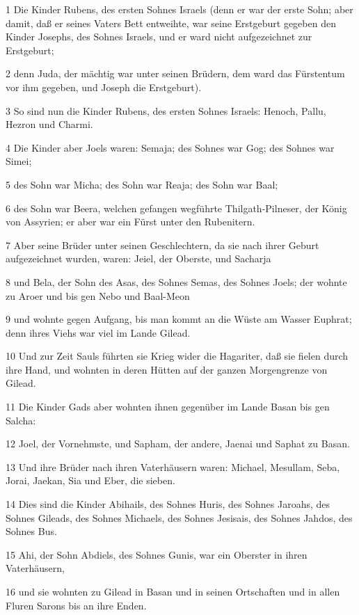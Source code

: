 \par 1 Die Kinder Rubens, des ersten Sohnes Israels (denn er war der erste Sohn; aber damit, daß er seines Vaters Bett entweihte, war seine Erstgeburt gegeben den Kinder Josephs, des Sohnes Israels, und er ward nicht aufgezeichnet zur Erstgeburt;
\par 2 denn Juda, der mächtig war unter seinen Brüdern, dem ward das Fürstentum vor ihm gegeben, und Joseph die Erstgeburt).
\par 3 So sind nun die Kinder Rubens, des ersten Sohnes Israels: Henoch, Pallu, Hezron und Charmi.
\par 4 Die Kinder aber Joels waren: Semaja; des Sohnes war Gog; des Sohnes war Simei;
\par 5 des Sohn war Micha; des Sohn war Reaja; des Sohn war Baal;
\par 6 des Sohn war Beera, welchen gefangen wegführte Thilgath-Pilneser, der König von Assyrien; er aber war ein Fürst unter den Rubenitern.
\par 7 Aber seine Brüder unter seinen Geschlechtern, da sie nach ihrer Geburt aufgezeichnet wurden, waren: Jeiel, der Oberste, und Sacharja
\par 8 und Bela, der Sohn des Asas, des Sohnes Semas, des Sohnes Joels; der wohnte zu Aroer und bis gen Nebo und Baal-Meon
\par 9 und wohnte gegen Aufgang, bis man kommt an die Wüste am Wasser Euphrat; denn ihres Viehs war viel im Lande Gilead.
\par 10 Und zur Zeit Sauls führten sie Krieg wider die Hagariter, daß sie fielen durch ihre Hand, und wohnten in deren Hütten auf der ganzen Morgengrenze von Gilead.
\par 11 Die Kinder Gads aber wohnten ihnen gegenüber im Lande Basan bis gen Salcha:
\par 12 Joel, der Vornehmste, und Sapham, der andere, Jaenai und Saphat zu Basan.
\par 13 Und ihre Brüder nach ihren Vaterhäusern waren: Michael, Mesullam, Seba, Jorai, Jaekan, Sia und Eber, die sieben.
\par 14 Dies sind die Kinder Abihails, des Sohnes Huris, des Sohnes Jaroahs, des Sohnes Gileads, des Sohnes Michaels, des Sohnes Jesisais, des Sohnes Jahdos, des Sohnes Bus.
\par 15 Ahi, der Sohn Abdiels, des Sohnes Gunis, war ein Oberster in ihren Vaterhäusern,
\par 16 und sie wohnten zu Gilead in Basan und in seinen Ortschaften und in allen Fluren Sarons bis an ihre Enden.
